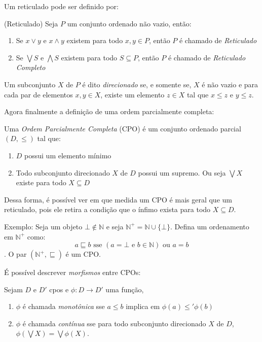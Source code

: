 \documentclass[../main.tex]{subfiles}
\begin{document}
Um reticulado pode ser definido por:

\begin{definition}(Reticulado)
    Seja $P$ um conjunto ordenado não vazio, então:
    \begin{enumerate}
        \item Se $x \vee y$ e $x \land y$ existem para todo $x, y \in P$, então $P$ é chamado de \emph{Reticulado}
        \item Se $\bigvee S$ e $\bigwedge S$ existem para todo $S \subseteq P$, então $P$ é chamado de \emph{Reticulado Completo}
    \end{enumerate}
\end{definition}


\begin{definition}
    Um subconjunto $X$ de $P$ é dito \emph{direcionado} se, e somente se, $X$ é não vazio e para cada par de elementos $x, y \in X$, existe um elemento $z \in X$ tal que $x \leq z$ e $y \leq z$.
\end{definition}

Agora finalmente a definição de uma ordem parcialmente completa:

\begin{definition}
    Uma \emph{Ordem Parcialmente Completa} (CPO) é um conjunto ordenado parcial $(D, \leq)$ tal que:
    \begin{enumerate}
        \item $D$ possui um elemento mínimo
        \item Todo subconjunto direcionado $X$ de $D$ possui um supremo. Ou seja $\bigvee X$ existe para todo $X \subseteq D$
    \end{enumerate}
\end{definition}

Dessa forma, é possível ver em que medida um CPO é mais geral que um reticulado, pois ele retira a condição que o ínfimo exista para todo $X \subseteq D$.

Exemplo: Seja um objeto $\bot \not\in \mathbb{N}$ e seja $\mathbb{N}^+ = \mathbb{N} \cup \{\bot\}$. Defina um ordenamento em $\mathbb{N}^+$ como: $$a \sqsubseteq b \text{ sse } (a = \bot \text{ e } b \in \mathbb{N}) \text{ ou } a = b$$. O par $(\mathbb{N}^+, \sqsubseteq)$ é um CPO.

É possível descrever \emph{morfismos} entre CPOs:

\begin{definition}
    Sejam $D$ e $D'$ cpos e $\phi : D \to D'$ uma função,
    \begin{enumerate}
        \item $\phi$ é chamada \emph{monotônica} sse $a \leq b$ implica em $\phi (a) \leq' \phi (b)$
        \item $\phi$ é chamada \emph{contínua} sse para todo subconjunto direcionado $X$ de $D$, $\phi (\bigvee X) = \bigvee \phi (X)$.
    \end{enumerate}
\end{definition}
\end{document}
